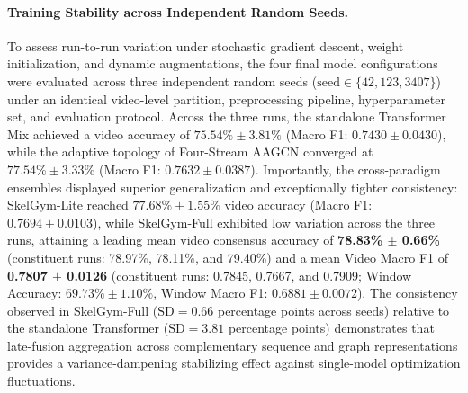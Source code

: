 \documentclass[runningheads]{llncs}
\begin{document}
\paragraph{Training Stability across Independent Random Seeds.}
To assess run-to-run variation under stochastic gradient descent, weight initialization, and dynamic augmentations, the four final model configurations were evaluated across three independent random seeds ($\text{seed} \in \{42, 123, 3407\}$) under an identical video-level partition, preprocessing pipeline, hyperparameter set, and evaluation protocol. Across the three runs, the standalone Transformer Mix achieved a video accuracy of $75.54\% \pm 3.81\%$ (Macro F1: $0.7430 \pm 0.0430$), while the adaptive topology of Four-Stream AAGCN converged at $77.54\% \pm 3.33\%$ (Macro F1: $0.7632 \pm 0.0387$). Importantly, the cross-paradigm ensembles displayed superior generalization and exceptionally tighter consistency: SkelGym-Lite reached $77.68\% \pm 1.55\%$ video accuracy (Macro F1: $0.7694 \pm 0.0103$), while SkelGym-Full exhibited low variation across the three runs, attaining a leading mean video consensus accuracy of \textbf{78.83\% $\pm$ 0.66\%} (constituent runs: 78.97\%, 78.11\%, and 79.40\%) and a mean Video Macro F1 of \textbf{0.7807 $\pm$ 0.0126} (constituent runs: 0.7845, 0.7667, and 0.7909; Window Accuracy: $69.73\% \pm 1.10\%$, Window Macro F1: $0.6881 \pm 0.0072$). The consistency observed in SkelGym-Full ($\text{SD} = 0.66$ percentage points across seeds) relative to the standalone Transformer ($\text{SD} = 3.81$ percentage points) demonstrates that late-fusion aggregation across complementary sequence and graph representations provides a variance-dampening stabilizing effect against single-model optimization fluctuations.
\end{document}
